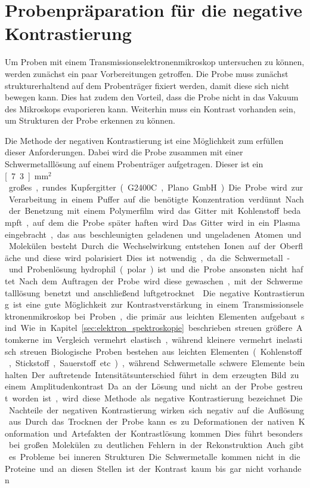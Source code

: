 \section{Probenpräparation für die negative Kontrastierung} %
\label{sec:probenpr_aparation_mit_negativer_kontrastierung}

Um Proben mit einem Transmissionselektronenmikroskop untersuchen zu können, werden zunächst ein paar Vorbereitungen getroffen.
Die Probe muss zunächst strukturerhaltend auf dem Probenträger fixiert werden, damit diese sich nicht bewegen kann.
Dies hat zudem den Vorteil, dass die Probe nicht in das Vakuum des Mikroskops evaporieren kann.
Weiterhin muss ein Kontrast vorhanden sein, um Strukturen der Probe erkennen zu können.

Die Methode der negativen Kontrastierung ist eine Möglichkeit zum erfüllen dieser Anforderungen.
Dabei wird die Probe zusammen mit einer Schwermetalllösung auf einem Probenträger aufgetragen.
Dieser ist ein \unit[7.3]{mm$^2$} großes, rundes Kupfergitter (G2400C, Plano GmbH).
Die Probe wird zur Verarbeitung in einem Puffer auf die benötigte Konzentration verdünnt.
Nach der Benetzung mit einem Polymerfilm wird das Gitter mit Kohlenstoff bedampft, auf dem die Probe später haften wird.
Das Gitter wird in ein Plasma eingebracht, das aus beschleunigten geladenen und ungeladenen Atomen und Molekülen besteht.
Durch die Wechselwirkung entstehen Ionen auf der Oberfläche und diese wird polarisiert.
Dies ist notwendig, da die Schwermetall- und Probenlösung hydrophil (polar) ist und die Probe ansonsten nicht haftet.
Nach dem Auftragen der Probe wird diese gewaschen, mit der Schwermetalllösung benetzt und anschließend luftgetrocknet \cite{neg_stain}.

Die negative Kontrastierung ist eine gute Möglichkeit zur Kontrastverstärkung in einem Transmissionselektronenmikroskop bei Proben, die primär aus leichten Elementen aufgebaut sind.
Wie in Kapitel \ref{sec:elektron_spektroskopie} beschrieben streuen größere Atomkerne im Vergleich vermehrt elastisch, während kleinere vermehrt inelastisch streuen.
Biologische Proben bestehen aus leichten Elementen (Kohlenstoff, Stickstoff, Sauerstoff etc.), während Schwermetalle schwere Elemente beinhalten.
Der auftretende Intensitätsunterschied führt in dem erzeugten Bild zu einem Amplitudenkontrast.
Da an der Lösung und nicht an der Probe gestreut worden ist, wird diese Methode als negative Kontrastierung bezeichnet.

Die Nachteile der negativen Kontrastierung wirken sich negativ auf die Auflösung aus.
Durch das Trocknen der Probe kann es zu Deformationen der nativen Konformation und Artefakten der Kontrastlösung kommen.
Dies führt besonders bei großen Molekülen zu deutlichen Fehlern in der Rekonstruktion.
Auch gibt es Probleme bei inneren Strukturen. 
Die Schwermetalle kommen nicht in die Proteine und an diesen Stellen ist der Kontrast kaum bis gar nicht vorhanden.

\FloatBarrier
